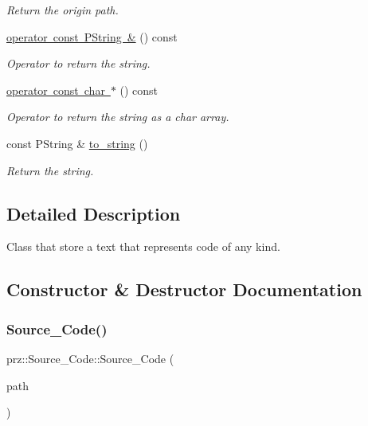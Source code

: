 \begin{DoxyCompactItemize}
\begin{DoxyCompactList}\small\item\em Return the origin path. \end{DoxyCompactList}\item 
\mbox{\hyperlink{classprz_1_1_source___code_a24694b6a8d40fc32cfa6cf972f30f252}{operator const P\+String \&}} () const
\begin{DoxyCompactList}\small\item\em Operator to return the string. \end{DoxyCompactList}\item 
\mbox{\hyperlink{classprz_1_1_source___code_ad23958a94d4d9bf384e1793846579942}{operator const char $\ast$}} () const
\begin{DoxyCompactList}\small\item\em Operator to return the string as a char array. \end{DoxyCompactList}\item 
const P\+String \& \mbox{\hyperlink{classprz_1_1_source___code_a880bb787781f99a756fbc24bf97418b8}{to\+\_\+string}} ()
\begin{DoxyCompactList}\small\item\em Return the string. \end{DoxyCompactList}\end{DoxyCompactItemize}


\subsection{Detailed Description}
Class that store a text that represents code of any kind. 



\subsection{Constructor \& Destructor Documentation}
\mbox{\label{classprz_1_1_source___code_a908df27e0a26b4e6b4c5197853e6cb78}} 
\subsubsection{\texorpdfstring{Source\_Code()}{Source\_Code()}}
{\footnotesize\ttfamily prz\+::\+Source\+\_\+\+Code\+::\+Source\+\_\+\+Code (\begin{DoxyParamCaption}\item[{const P\+String \&}]{path }\end{DoxyParamCaption})\hspace{0.3cm}{\ttfamily [inline]}}



